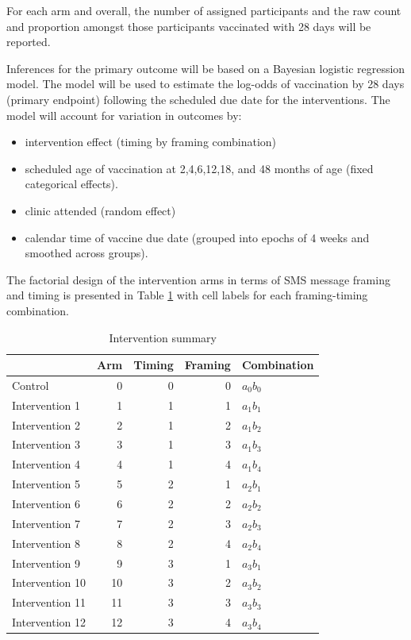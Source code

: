 \documentclass[
  bibliography=totoc]{scrreprt}
\providecommand{\tightlist}{%
  \setlength{\itemsep}{0pt}\setlength{\parskip}{0pt}}
\begin{document}
For each arm and overall, the number of assigned participants and the raw count and proportion amongst those participants vaccinated with 28 days will be reported.

Inferences for the primary outcome will be based on a Bayesian logistic regression model.
The model will be used to estimate the log-odds of vaccination by 28 days (primary endpoint) following the scheduled due date for the interventions.
The model will account for variation in outcomes by:

\begin{itemize}
\tightlist
\item
  intervention effect (timing by framing combination)
\item
  scheduled age of vaccination at 2,4,6,12,18, and 48 months of age (fixed categorical effects).
\item
  clinic attended (random effect)
\item
  calendar time of vaccine due date (grouped into epochs of 4 weeks and smoothed across groups).
\end{itemize}

The factorial design of the intervention arms in terms of SMS message framing and timing is presented in Table \ref{tab:intsum} with cell labels for each framing-timing combination.

\begin{table}[H]

\caption{\label{tab:intsum}Intervention summary}
\centering
\fontsize{10}{12}\selectfont
\begin{tabular}[t]{lrrrl}
\toprule
  & Arm & Timing & Framing & Combination\\
\midrule
Control & 0 & 0 & 0 & $a_0b_0$\\
Intervention 1 & 1 & 1 & 1 & $a_1$$b_1$\\
Intervention 2 & 2 & 1 & 2 & $a_1$$b_2$\\
Intervention 3 & 3 & 1 & 3 & $a_1$$b_3$\\
Intervention 4 & 4 & 1 & 4 & $a_1$$b_4$\\
Intervention 5 & 5 & 2 & 1 & $a_2$$b_1$\\
Intervention 6 & 6 & 2 & 2 & $a_2$$b_2$\\
Intervention 7 & 7 & 2 & 3 & $a_2$$b_3$\\
Intervention 8 & 8 & 2 & 4 & $a_2$$b_4$\\
Intervention 9 & 9 & 3 & 1 & $a_3$$b_1$\\
Intervention 10 & 10 & 3 & 2 & $a_3$$b_2$\\
Intervention 11 & 11 & 3 & 3 & $a_3$$b_3$\\
Intervention 12 & 12 & 3 & 4 & $a_3$$b_4$\\
\bottomrule
\end{tabular}
\end{table}
\end{document}
